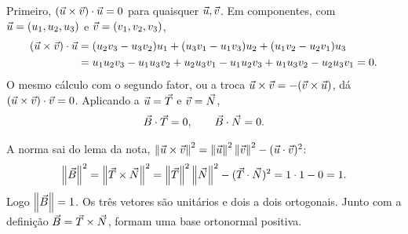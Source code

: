 \documentclass[11pt,a4paper]{article}
\begin{document}
Primeiro, \((\vec{u}\times\vec{v})\cdot\vec{u}=0\) para quaisquer \(\vec{u},\vec{v}\). Em componentes, com \(\vec{u}=(u_{1},u_{2},u_{3})\) e \(\vec{v}=(v_{1},v_{2},v_{3})\),
\begin{align*}
(\vec{u}\times\vec{v})\cdot\vec{u}
&=(u_{2}v_{3}-u_{3}v_{2})u_{1}+(u_{3}v_{1}-u_{1}v_{3})u_{2}+(u_{1}v_{2}-u_{2}v_{1})u_{3}\\
&=u_{1}u_{2}v_{3}-u_{1}u_{3}v_{2}+u_{2}u_{3}v_{1}-u_{1}u_{2}v_{3}+u_{1}u_{3}v_{2}-u_{2}u_{3}v_{1}
=0.
\end{align*}
O mesmo cálculo com o segundo fator, ou a troca \(\vec{u}\times\vec{v}=-(\vec{v}\times\vec{u})\), dá \((\vec{u}\times\vec{v})\cdot\vec{v}=0\). Aplicando a \(\vec{u}=\vec{T}\) e \(\vec{v}=\vec{N}\),
\[
\vec{B}\cdot\vec{T}=0,
\qquad
\vec{B}\cdot\vec{N}=0.
\]

A norma sai do lema da nota, \(\left\lVert \vec{u}\times\vec{v} \right\rVert^{2}=\left\lVert \vec{u} \right\rVert^{2}\left\lVert \vec{v} \right\rVert^{2}-(\vec{u}\cdot\vec{v})^{2}\):
\[
\left\lVert \vec{B} \right\rVert^{2}
=\left\lVert \vec{T}\times\vec{N} \right\rVert^{2}
=\left\lVert \vec{T} \right\rVert^{2}\left\lVert \vec{N} \right\rVert^{2}-(\vec{T}\cdot\vec{N})^{2}
=1\cdot 1-0
=1.
\]
Logo \(\left\lVert \vec{B} \right\rVert=1\). Os três vetores são unitários e dois a dois ortogonais. Junto com a definição \(\vec{B}=\vec{T}\times\vec{N}\), formam uma base ortonormal positiva.
\end{document}

